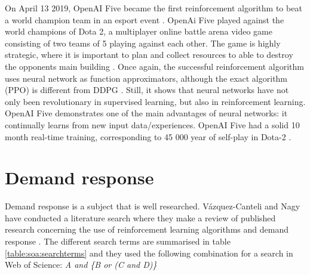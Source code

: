 \documentclass[class=book, crop=false]{standalone}
\begin{document}
On April 13 2019, OpenAI Five became the first reinforcement algorithm to beat a world champion team in an esport event \cite{openai_dota}. OpenAi Five played against the world champions of Dota 2, a multiplayer online battle arena video game consisting of two teams of 5 playing against each other. The game is highly strategic, where it is important to plan and collect resources to able to destroy the opponents main building \cite{dota_wiki}. Once again, the successful reinforcement algorithm uses neural network as function approximators, although the exact algorithm (PPO) is different from DDPG \cite{PPO_openAI_Schulman}. Still, it shows that neural networks have not only been revolutionary in supervised learning, but also in reinforcement learning. OpenAI Five demonstrates one of the main advantages of neural networks: it continually learns from new input data/experiences. OpenAI Five had a solid 10 month real-time training, corresponding to 45 000 year of self-play in Dota-2 \cite{openai_dota}.


\section{Demand response}
Demand response is a subject that is well researched. Vázquez-Canteli and Nagy have conducted a literature search where they make a review of published research concerning the use of reinforcement learning algorithms and demand response \cite{vazquez2019reinforcement}. The different search terms are summarised in table \ref{table:soa:searchterms} and they used the following combination for a search in  Web of Science: \textit{A and \{B or (C and D)\}}
\end{document}
